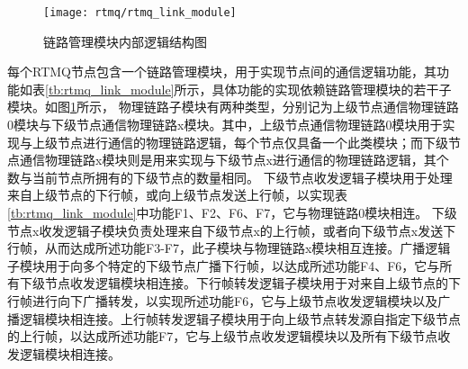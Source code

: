 \begin{figure}
    \centering
    \caption[链路管理模块内部逻辑结构图]{链路管理模块内部逻辑结构图\label{fig:rtmq_link_module}}
    \texttt{[image: rtmq/rtmq\_link\_module]}
\end{figure}

每个RTMQ节点包含一个链路管理模块，用于实现节点间的通信逻辑功能，其功能如表\ref{tb:rtmq_link_module}所示，具体功能的实现依赖链路管理模块的若干子模块。如图\ref{fig:rtmq_link_module}所示，
物理链路子模块有两种类型，分别记为上级节点通信物理链路0模块与下级节点通信物理链路x模块。其中，上级节点通信物理链路0模块用于实现与上级节点进行通信的物理链路逻辑，每个节点仅具备一个此类模块；而下级节点通信物理链路x模块则是用来实现与下级节点x进行通信的物理链路逻辑，其个数与当前节点所拥有的下级节点的数量相同。
下级节点收发逻辑子模块用于处理来自上级节点的下行帧，或向上级节点发送上行帧，以实现表\ref{tb:rtmq_link_module}中功能F1、F2、F6、F7，它与物理链路0模块相连。
下级节点x收发逻辑子模块负责处理来自下级节点x的上行帧，或者向下级节点x发送下行帧，从而达成所述功能F3-F7，此子模块与物理链路x模块相互连接。广播逻辑子模块用于向多个特定的下级节点广播下行帧，以达成所述功能F4、F6，它与所有下级节点收发逻辑模块相连接。下行帧转发逻辑子模块用于对来自上级节点的下行帧进行向下广播转发，以实现所述功能F6，它与上级节点收发逻辑模块以及广播逻辑模块相连接。上行帧转发逻辑子模块用于向上级节点转发源自指定下级节点的上行帧，以达成所述功能F7，它与上级节点收发逻辑模块以及所有下级节点收发逻辑模块相连接。


